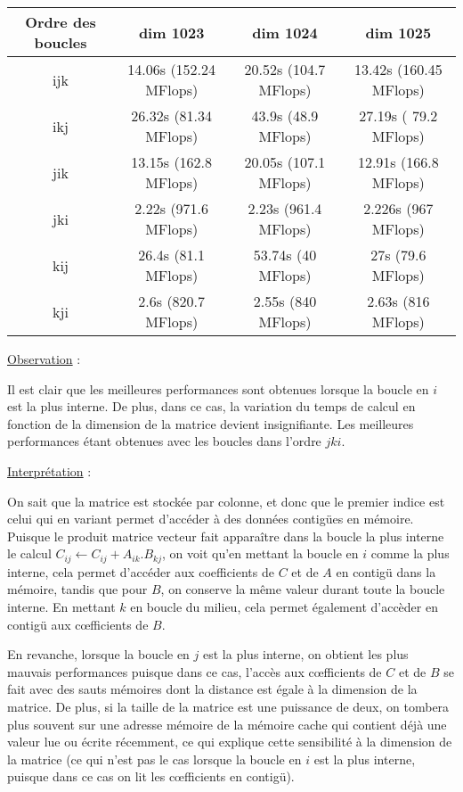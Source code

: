 \documentclass[fleqn,11pt]{article}
\begin{document}
\begin{tabular}{|c|c|c|c|}\hline
    \textbf{Ordre des boucles} & dim 1023 & dim 1024 & dim 1025 \\ \hline \hline 
    ijk & 14.06s (152.24 MFlops) & 20.52s (104.7 MFlops) & 13.42s (160.45 MFlops) \\ \hline
    ikj & 26.32s (81.34 MFlops)  & 43.9s  (48.9   MFlops) & 27.19s ( 79.2  MFlops) \\ \hline
    jik & 13.15s (162.8 MFlops)  & 20.05s (107.1 MFlops) & 12.91s (166.8 MFlops) \\   \hline
    jki & 2.22s   (971.6 MFlops)  & 2.23s (961.4 MFlops) & 2.226s (967 MFlops) \\ \hline
    kij & 26.4s  (81.1 MFlops) & 53.74s (40 MFlops) & 27s (79.6 MFlops) \\ \hline
    kji & 2.6s (820.7 MFlops) & 2.55s (840 MFlops) & 2.63s (816 MFlops) \\ \hline
\end{tabular}

\underline{Observation} : 

Il est clair que les meilleures performances sont obtenues lorsque la boucle en $i$ est la plus interne.
De plus, dans ce cas, la variation du temps de calcul en fonction de la dimension de la matrice devient insignifiante. Les meilleures
performances étant obtenues avec les boucles dans l'ordre $jki$. 

\underline{Interprétation} : 

On sait que la matrice est stockée par colonne, et donc que le premier indice est celui qui en variant permet 
d'accéder à des données contigües en mémoire. Puisque le produit matrice vecteur fait apparaître dans la boucle la plus interne le calcul 
$C_{ij} \leftarrow C_{ij} + A_{ik}.B_{kj}$, on voit qu'en mettant la boucle en $i$ comme la plus interne, cela permet d'accéder aux 
c{oe}fficients de $C$ et de $A$ en contigü dans la mémoire, tandis que pour $B$, on conserve la même valeur durant toute la boucle interne.
En mettant $k$ en boucle du milieu, cela permet également d'accèder en contigü aux c{\oe}fficients de $B$. 

En revanche, lorsque la boucle en $j$ est la plus interne, on obtient les plus mauvais performances puisque dans ce cas, l'accès aux 
c{\oe}fficients de $C$ et de $B$ se fait avec des sauts mémoires dont la distance est égale à la dimension de la matrice. De plus, si la 
taille de la matrice est une puissance de deux, on tombera plus souvent sur une adresse mémoire de la mémoire cache qui contient déjà une valeur
lue ou écrite récemment, ce qui explique cette sensibilité à la dimension de la matrice (ce qui n'est pas le cas lorsque la boucle en $i$ 
est la plus interne, puisque dans ce cas on lit les c{\oe}fficients en contigü).
\end{document}
